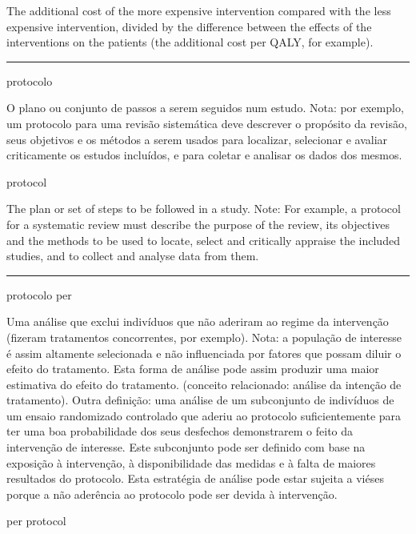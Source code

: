 \documentclass[
  openany]{book}
\begin{document}
The additional cost of the more expensive intervention compared with the less expensive intervention, divided by the difference between the effects of the interventions on the patients (the additional cost per QALY, for example).

\begin{center}\rule{0.5\linewidth}{0.5pt}\end{center}

protocolo

O plano ou conjunto de passos a serem seguidos num estudo. Nota: por exemplo, um protocolo para uma revisão sistemática deve descrever o propósito da revisão, seus objetivos e os métodos a serem usados para localizar, selecionar e avaliar criticamente os estudos incluídos, e para coletar e analisar os dados dos mesmos.

protocol

The plan or set of steps to be followed in a study. Note: For example, a protocol for a systematic review must describe the purpose of the review, its objectives and the methods to be used to locate, select and critically appraise the included studies, and to collect and analyse data from them.

\begin{center}\rule{0.5\linewidth}{0.5pt}\end{center}

protocolo per

Uma análise que exclui indivíduos que não aderiram ao regime da intervenção (fizeram tratamentos concorrentes, por exemplo). Nota: a população de interesse é assim altamente selecionada e não influenciada por fatores que possam diluir o efeito do tratamento. Esta forma de análise pode assim produzir uma maior estimativa do efeito do tratamento. (conceito relacionado: análise da intenção de tratamento). Outra definição: uma análise de um subconjunto de indivíduos de um ensaio randomizado controlado que aderiu ao protocolo suficientemente para ter uma boa probabilidade dos seus desfechos demonstrarem o feito da intervenção de interesse. Este subconjunto pode ser definido com base na exposição à intervenção, à disponibilidade das medidas e à falta de maiores resultados do protocolo. Esta estratégia de análise pode estar sujeita a viéses porque a não aderência ao protocolo pode ser devida à intervenção.

per protocol
\end{document}
